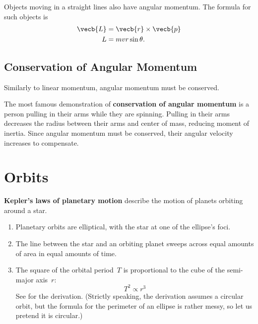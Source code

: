Objects moving in a straight lines also have angular momentum.
The formula for such objects is
\begin{subequations}
    \begin{align}
        \vecb{L} &= \vecb{r} \times \vecb{p} \\
        L &= m v r \sin\theta. \label{eq:angular-momentum-linear-velocity}
    \end{align}
\end{subequations}

\subsection{Conservation of Angular Momentum}

Similarly to linear momentum, angular momentum must be conserved.

The most famous demonstration of \textbf{conservation of angular momentum}
is a person pulling in their arms while they are spinning.
Pulling in their arms decreases the radius between their arms and
center of mass,
reducing moment of inertia.
Since angular momentum must be conserved,
their angular velocity increases to compensate.

\section{Orbits} \label{sec:orbits}

\textbf{Kepler's laws of planetary motion}
describe the motion of planets orbiting around a star.
\begin{enumerate}
    \item Planetary orbits are elliptical,
        with the star at one of the ellipse's foci.
    \item \label{itm:keplers-2nd-law}
        The line between the star and an orbiting planet
        sweeps across equal amounts of area in equal amounts of time.
    \item The square of the orbital period~\(T\) is proportional to
        the cube of the semi-major axis~\(r\):
        \begin{equation}
            T^2 \propto r^3
        \end{equation}
        See  for the derivation.
        (Strictly speaking, the derivation assumes a circular orbit,
            but the formula for the perimeter of an ellipse is rather messy,
        so let us pretend it is circular.)
\end{enumerate}

